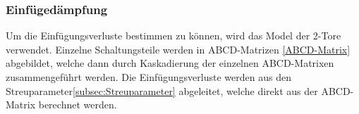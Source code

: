 \subsubsection{Einfügedämpfung}\label{subsec:einfuge}


 Um die Einfügungsverluste bestimmen zu können, wird das Model der 2-Tore verwendet. Einzelne Schaltungsteile werden in ABCD-Matrizen \ref{ABCD-Matrix} abgebildet, welche dann durch Kaskadierung der einzelnen ABCD-Matrixen zusammengeführt werden. Die Einfügungsverluste werden aus den Streuparameter\ref{subsec:Streuparameter} abgeleitet, welche direkt aus der ABCD-Matrix berechnet werden.



